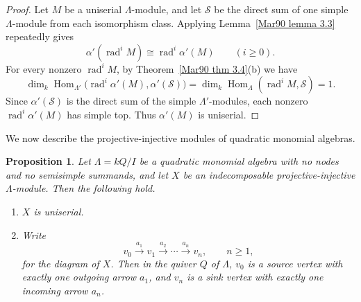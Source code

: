 \documentclass[11pt]{article}
\newcommand{\rad}{\operatorname{rad}}
\newcommand{\Hom}{\operatorname{Hom}}
\providecommand{\varLambda}{\Lambda}
\newtheorem{proposition}[theorem]{Proposition}
\theoremstyle{definition}
\begin{document}
		\begin{proof}
			Let $M$ be a uniserial $\varLambda$-module, and let $\mathcal S$ be the direct sum of one simple $\varLambda$-module from each isomorphism class.
			Applying Lemma~\ref{Mar90 lemma 3.3} repeatedly gives
			\[
				\alpha'(\rad^iM)\cong\rad^i\alpha'(M)\qquad(i\geq0).
			\]
			For every nonzero $\rad^iM$, by Theorem~\ref{Mar90 thm 3.4}(b) we have
			\[
				\dim_k\Hom_{\varLambda'}
				\bigl(\rad^i\alpha'(M),\alpha'(\mathcal S)\bigr)
				=\dim_k\Hom_{\varLambda}(\rad^iM,\mathcal S)=1.
			\]
			Since $\alpha'(\mathcal S)$ is the direct sum of the simple $\varLambda'$-modules, each nonzero $\rad^i\alpha'(M)$ has simple top.
			Thus $\alpha'(M)$ is uniserial.
		\end{proof}

		We now describe the projective-injective modules of quadratic monomial algebras.

		\begin{proposition}\label{prop of proj-injective modules}
			Let $\varLambda=kQ/I$ be a quadratic monomial algebra with no nodes and no semisimple summands, and let $X$ be an indecomposable projective-injective $\varLambda$-module.
			Then the following hold.
			\begin{enumerate}
				\item $X$ is uniserial.
				\item Write
				\[
					v_0\xrightarrow{a_1}v_1\xrightarrow{a_2}\cdots\xrightarrow{a_n}v_n,\qquad n\geq1,
				\]
				for the diagram of $X$.
				Then in the quiver $Q$ of $\varLambda$, $v_0$ is a source vertex with exactly one outgoing arrow $a_1$, and $v_n$ is a sink vertex with exactly one incoming arrow $a_n$.
			\end{enumerate}
		\end{proposition}
\end{document}
